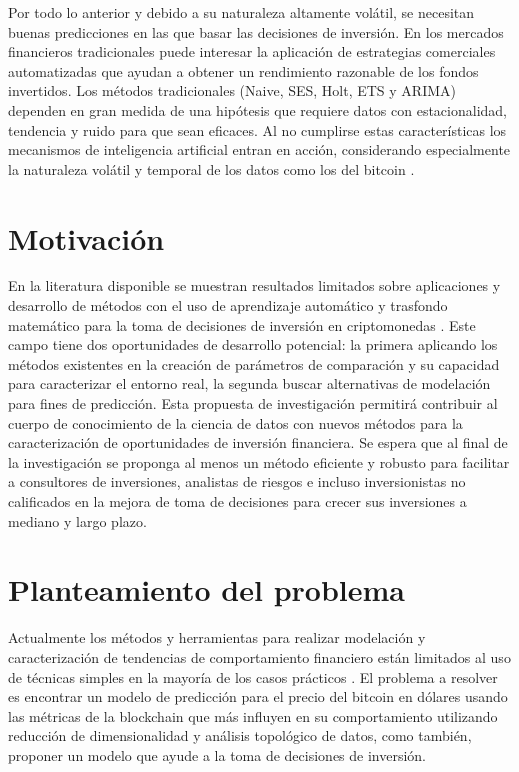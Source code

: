 Por todo lo anterior y debido a su naturaleza altamente volátil, se necesitan buenas predicciones en las que basar las decisiones de inversión. En los mercados financieros tradicionales puede interesar la aplicación de estrategias comerciales automatizadas que ayudan a obtener un rendimiento razonable de los fondos invertidos. Los métodos tradicionales (Naive, SES, Holt, ETS y ARIMA) dependen en gran medida de una hipótesis que requiere datos con estacionalidad, tendencia y ruido para que sean eficaces. Al no cumplirse estas características los mecanismos de inteligencia artificial entran en acción, considerando especialmente la naturaleza volátil y temporal de los datos como los del bitcoin \cite{tandonBitcoinPriceForecasting2019}.

\section{Motivación}
En la literatura disponible se muestran resultados limitados sobre aplicaciones y desarrollo de métodos con el uso de aprendizaje automático y trasfondo matemático para la toma de decisiones de inversión en criptomonedas \cite{felizardoComparativeStudyBitcoin2019,tandonBitcoinPriceForecasting2019,phaladisailoedMachineLearningModels2018}. Este campo tiene dos oportunidades de desarrollo potencial: la primera aplicando los métodos existentes en la creación de parámetros de comparación y su capacidad para caracterizar el entorno real, la segunda buscar alternativas de modelación para fines de predicción.
Esta propuesta de investigación permitirá contribuir al cuerpo de conocimiento de la ciencia de datos con nuevos métodos para la caracterización de oportunidades de inversión financiera. Se espera que al final de la investigación se proponga al menos un método eficiente y robusto para facilitar a consultores de inversiones, analistas de riesgos e incluso inversionistas no calificados en la mejora de toma de decisiones para crecer sus inversiones a mediano y largo plazo.

\section{Planteamiento del problema}
Actualmente los métodos y herramientas para realizar modelación y caracterización de tendencias de comportamiento financiero están limitados al uso de técnicas simples en la mayoría de los casos prácticos \cite{zbikowskiApplicationMachineLearning2016}. El problema a resolver es encontrar un modelo de predicción para el precio del bitcoin en dólares usando las métricas de la blockchain que más influyen en su comportamiento utilizando reducción de dimensionalidad y análisis topológico de datos, como también, proponer un modelo que ayude a la toma de decisiones de inversión.


